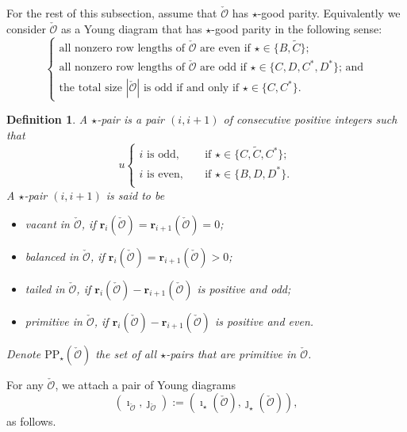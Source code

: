 \documentclass[12pt,a4paper]{amsart}
\def\abs#1{\left|{#1}\right|}
\newcommand{\CO}{{\mathcal {O}}}
\numberwithin{equation}{section}
\newtheorem{defn}[thm]{Definition}
\theoremstyle{remark}
\begin{document}
For the rest of this subsection, assume that $\check \CO$ has  $\star$-good parity. Equivalently we consider $\check \CO$ as a Young diagram that has $\star$-good parity in the following sense:
\[
  \left\{ \begin{array}{l}
               \textrm{all nonzero row lengths of $\check \CO$ are even if $\star\in \{B, \widetilde{C}\}$;}\\
                     \textrm{all nonzero row lengths of $\check \CO$ are odd if $\star\in \{C, D, C^*, D^*\}$; and}\\
                        \textrm{the total size $\abs{\check \CO}$ is  odd if and only if $\star\in \{C, C^*\}$}.                   \end{array}
                 \right.
\]


\begin{defn}
 A $\star$-pair is a pair  $(i,i+1)$ of consecutive positive integers such that
\[u
   \left\{
     \begin{array}{ll}
      i\textrm{ is odd}, \quad &\textrm{if $\star\in\{C, \widetilde{C}, C^*\}$};  \\
      i \textrm{ is even}, \quad &\textrm{if $\star\in\{B, D, D^*\}$}. \\
       \end{array}
   \right.
\]
A $\star$-pair   $(i,i+1)$ is said to be
\begin{itemize}
\item
vacant in $\check \CO$, if $\mathbf r_i(\check \CO)=\mathbf r_{i+1}(\check \CO)=0$;
\item
balanced in $\check \CO$,  if  $\mathbf r_i(\check \CO)=\mathbf r_{i+1}(\check \CO)>0$;
\item
tailed in $\check \CO$,  if  $\mathbf r_i(\check \CO)-\mathbf r_{i+1}(\check \CO)$ is positive and odd;
\item
primitive in $\check \CO$, if    $\mathbf r_i(\check \CO)-\mathbf r_{i+1}(\check \CO)$ is positive and even.
\end{itemize}
Denote $\mathrm{PP}_\star(\check \CO)$ the  set of all $\star$-pairs that are primitive in $\check \CO$.
\end{defn}

For any $\check \CO$, we attach a pair of Young diagrams
\[
(\imath_{\check \CO}, \jmath_{\check \CO}):=(\imath_\star(\check \CO), \jmath_\star(\check \CO)),
\]
as follows.
\end{document}
